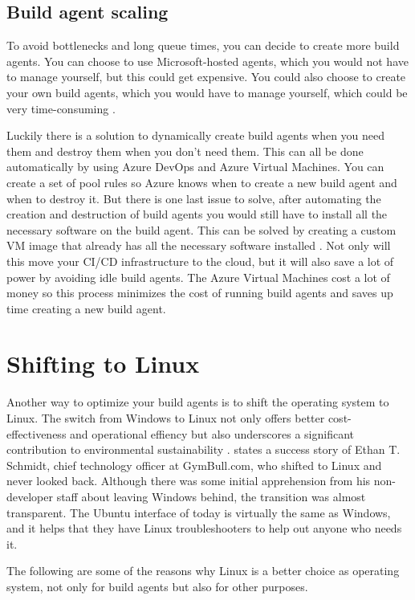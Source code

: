 \subsection{Build agent scaling}
To avoid bottlenecks and long queue times, you can decide to create more build agents.
You can choose to use Microsoft-hosted agents, which you would not have to manage yourself, but this could get expensive.
You could also choose to create your own build agents, which you would have to manage yourself, which could be very time-consuming \autocite{Keiholz2023}.

Luckily there is a solution to dynamically create build agents when you need them and destroy them when you don't need them.
This can all be done automatically by using Azure DevOps and Azure Virtual Machines. You can create a set of pool rules so Azure knows when to create a new build agent and when to destroy it.
But there is one last issue to solve, after automating the creation and destruction of build agents you would still have to install all the necessary software on the build agent.
This can be solved by creating a custom VM image that already has all the necessary software installed \autocite{Keiholz2023}.
Not only will this move your CI/CD infrastructure to the cloud, but it will also save a lot of power by avoiding idle build agents.
The Azure Virtual Machines cost a lot of money so this process minimizes the cost of running build agents and saves up time creating a new build agent.

\section{Shifting to Linux}
Another way to optimize your build agents is to shift the operating system to Linux. 
The switch from Windows to Linux not only offers better cost-effectiveness and operational effiency but also underscores a significant contribution to environmental sustainability \autocite{Germain2017}.
\textcite{Germain2017} states a success story of Ethan T. Schmidt, chief technology officer at GymBull.com, who shifted to Linux and never looked back.
Although there was some initial apprehension from his non-developer staff about leaving Windows behind, the transition was almost transparent. 
The Ubuntu interface of today is virtually the same as Windows, and it helps that they have Linux troubleshooters to help out anyone who needs it. 

The following are some of the reasons why Linux is a better choice as operating system, not only for build agents but also for other purposes.

